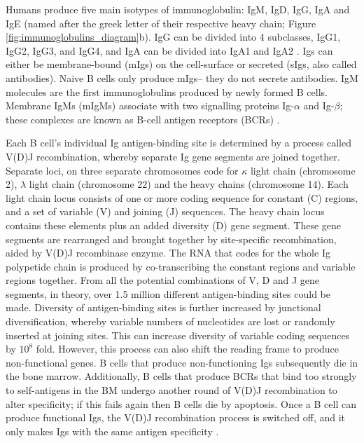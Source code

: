 Humans produce five main isotypes of immunoglobulin: IgM, IgD, IgG, IgA and IgE (named after the greek letter of their respective heavy chain; Figure \ref{fig:immunoglobulins_diagram}b).
IgG can be divided into 4 subclasses, IgG1, IgG2, IgG3, and IgG4, and IgA can be divided into IgA1 and IgA2 \cite{schroeder2010structure}.
Igs can either be membrane-bound (mIgs) on the cell-surface or secreted (sIgs, also called antibodies).
Naive B cells only produce mIgs-- they do not secrete antibodies.
IgM molecules are the first immunoglobulins produced by newly formed B cells.
Membrane IgMs (mIgMs) associate with two signalling proteins Ig-$\alpha$ and Ig-$\beta$; these complexes are known as B-cell antigen receptors (BCRs) \cite{friess2018structural, dylke2007role}.

Each B cell's individual Ig antigen-binding site is determined by a process called V(D)J recombination, whereby separate Ig gene segments are joined together.
Separate loci, on three separate chromosomes code for $\kappa$ light chain (chromosome 2), $\lambda$ light chain (chromosome 22) and the heavy chains (chromosome 14).
Each light chain locus consists of one or more coding sequence for constant (C) regions, and a set of variable (V) and joining (J) sequences.
The heavy chain locus contains these elements plus an added diversity (D) gene segment.
These gene segments are rearranged and brought together by site-specific recombination, aided by V(D)J recombinase enzyme.
The RNA that codes for the whole Ig polypetide chain is produced by co-transcribing the constant regions and variable regions together.
From all the potential combinations of V, D and J gene segments, in theory, over 1.5 million different antigen-binding sites could be made.
Diversity of antigen-binding sites is further increased by junctional diversification, whereby variable numbers of nucleotides are lost or randomly inserted at joining sites.
This can increase diversity of variable coding sequences by $10^8$ fold.
However, this process can also shift the reading frame to produce non-functional genes.
B cells that produce non-functioning Igs subsequently die in the bone marrow.
Additionally, B cells that produce BCRs that bind too strongly to self-antigens in the BM undergo another round of V(D)J recombination to alter specificity; if this fails again then B cells die by apoptosis.
Once a B cell can produce functional Igs, the V(D)J recombination process is switched off, and it only makes Igs with the same antigen specificity \cite{alberts2007molecularimmune}.

